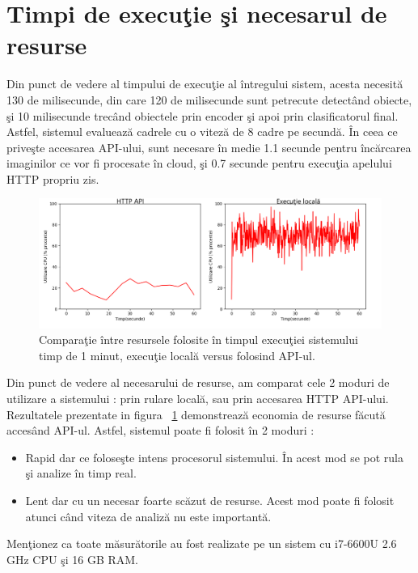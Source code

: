 \documentclass[a4paper,12pt]{report}
\begin{document}
\section {Timpi de execuţie şi necesarul de resurse}
\quad Din punct de vedere al timpului de execuţie al întregului sistem, acesta necesită 130 de milisecunde, din care 120 de milisecunde sunt petrecute detectând obiecte, şi 10 milisecunde trecând obiectele prin encoder şi apoi prin clasificatorul final. Astfel, sistemul evaluează cadrele cu o viteză de  8 cadre pe secundă. În ceea ce priveşte accesarea API-ului, sunt necesare în medie 1.1 secunde pentru încărcarea imaginilor ce vor fi procesate în cloud, şi 0.7 secunde pentru execuţia apelului HTTP propriu zis.
\begin{figure}[h]
\begin{center}
        \includegraphics[width = 1\textwidth]{images/comparatie_cpu_usage}
			 \caption{Comparaţie între resursele folosite în timpul execuţiei sistemului timp de 1 minut, execuţie locală versus folosind API-ul.}
			 \label{fig:comparatie_cpu}
\end{center}
\end{figure}
\par Din punct de vedere al necesarului de resurse, am comparat cele 2 moduri de utilizare a sistemului : prin rulare locală, sau prin accesarea HTTP API-ului. 
Rezultatele prezentate in figura ~\ref{fig:comparatie_cpu} demonstrează economia de resurse făcută accesând API-ul. Astfel, sistemul poate fi folosit în 2 moduri : 
\begin{itemize}
\item Rapid dar ce foloseşte intens procesorul sistemului. În acest mod se pot rula şi analize în timp real.
\item Lent dar cu un necesar foarte scăzut de resurse. Acest mod poate fi folosit atunci când viteza de analiză nu este importantă.
\end{itemize}
\par Menţionez ca toate măsurătorile au fost realizate pe un sistem cu i7-6600U 2.6 GHz CPU şi 16 GB RAM.
\end{document}
